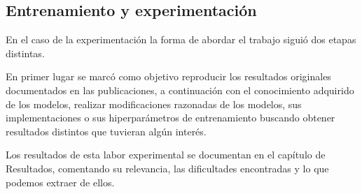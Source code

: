 \subsection{Entrenamiento y experimentación}

En el caso de la experimentación la forma de abordar el trabajo siguió dos etapas distintas. 

En primer lugar se marcó como objetivo reproducir los resultados originales documentados en las publicaciones, a continuación con el conocimiento adquirido de los modelos, realizar modificaciones razonadas de los modelos, sus implementaciones o sus hiperparámetros de entrenamiento buscando obtener resultados distintos que tuvieran algún interés.

Los resultados de esta labor experimental se documentan en el capítulo de Resultados, comentando su relevancia, las dificultades encontradas y lo que podemos extraer de ellos.


\newpage 